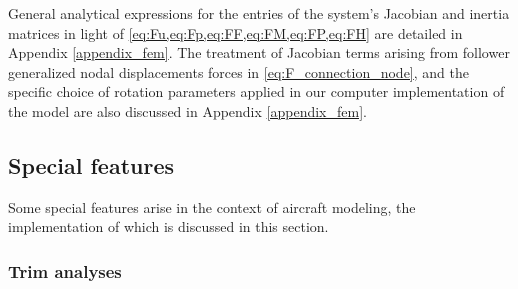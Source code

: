 \documentclass[12pt,a4paper,oneside,english]{abntex2} %
\begin{document}
General analytical expressions for the entries of the system's Jacobian and inertia matrices in light of \cref{eq:Fu,eq:Fp,eq:FF,eq:FM,eq:FP,eq:FH} are detailed in Appendix \ref{appendix_fem}. The treatment of Jacobian terms arising from follower generalized nodal displacements forces in \cref{eq:F_connection_node}, and the specific choice of rotation parameters applied in our computer implementation of the model are also discussed in Appendix \ref{appendix_fem}.

\subsection{Special features}
\label{sec:fem_special_features}

Some special features arise in the context of aircraft modeling, the implementation of which is discussed in this section.

\subsubsection{Trim analyses}
\label{sec:fem_trim_analyses}
\end{document}
